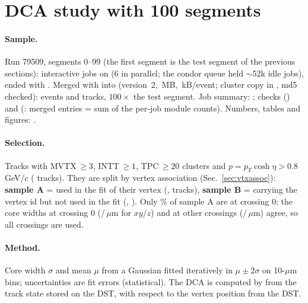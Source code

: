 \section{DCA study with 100 segments}
\label{sec:dca}

\paragraph{Sample.} Run 79509, segments 0--99 (the first segment is the test segment of the previous
sections): \sNJobs{} interactive jobs on  (6 in parallel; the condor queue held
$\sim$52k idle jobs), \sNJobsOK{} ended with . Merged with  into
 (version~2, \sSizeMB\,MB, \sSizekB\,kB/event; cluster copy in
, md5 checked): \sNEvents{} events and \sNTracks{}
tracks, $100\times$ the test segment. Job summary: ; checks
 (\chkSJobs) and  (\chkSEntries: merged entries = sum of the
per-job module counts). Numbers, tables and figures: .

\paragraph{Selection.} Tracks with MVTX\,$\geq3$, INTT\,$\geq1$, TPC\,$\geq20$ clusters and
$p=p_T\cosh\eta>0.8$\,GeV/$c$ (\sNGoodP{} tracks). They are split by vertex association
(Sec.~\ref{sec:vtxassoc}): \textbf{sample A} = used in the fit of their vertex (,
\sNSelA{} tracks), \textbf{sample B} = carrying the vertex id but not used in the fit
(, \sNSelB). Only \sFracSelXzero\% of sample A are at crossing 0; the core widths
at crossing 0 (\sSigXyXzero/\sSigZXzero\,$\mu$m for $xy$/$z$) and at other crossings
(\sSigXyXother/\sSigZXother\,$\mu$m) agree, so all crossings are used.

\paragraph{Method.} Core width $\sigma$ and mean $\mu$ from a Gaussian fitted iteratively in
$\mu\pm2\sigma$ on 10-$\mu$m bins; uncertainties are fit errors (statistical). The DCA is
computed by  from the track state stored on the DST, with respect
to the vertex position from the DST.


